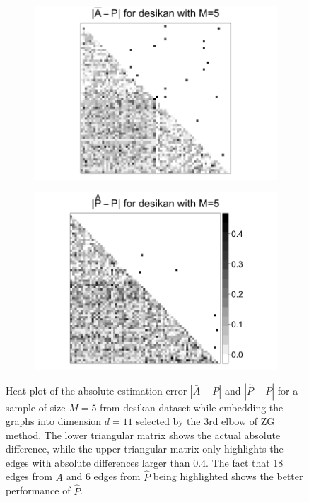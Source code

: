 \documentclass[a4paper]{article}
\begin{document}
\begin{figure}
\centering
\begin{subfigure}{.5\textwidth}
  \centering
  \includegraphics[width=1.2\linewidth]{Diff2_desikan_m5.png}
\end{subfigure}%
\begin{subfigure}{.5\textwidth}
  \centering
  \includegraphics[width=1.2\linewidth]{Diff3_desikan_m5.png}
\end{subfigure}
\caption{Heat plot of the absolute estimation error $|\bar{A} - P|$ and $|\hat{P} - P|$ for a sample of size $M=5$ from desikan dataset while embedding the graphs into dimension $d=11$ selected by the 3rd elbow of ZG method. The lower triangular matrix shows the actual absolute difference, while the upper triangular matrix only highlights the edges with absolute differences larger than $0.4$. The fact that 18 edges from $\bar{A}$ and 6 edges from $\hat{P}$ being highlighted shows the better performance of $\hat{P}$.}
\label{fig:Diff_desikan_m5}
\end{figure}
\end{document}
